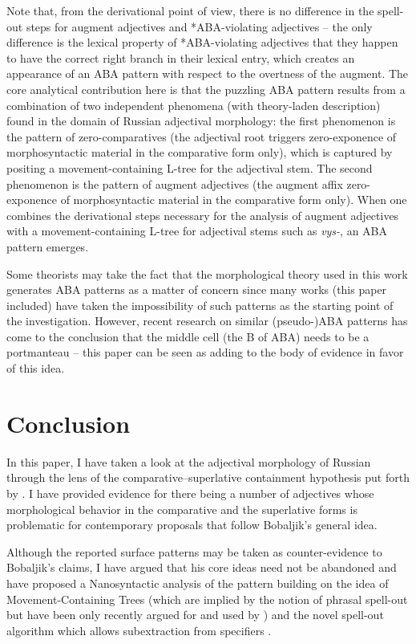 \documentclass[output=paper,colorlinks,citecolor=brown]{langscibook}
\begin{document}
Note that, from the derivational point of view, there is no difference in the spell-out steps for augment adjectives and {*}ABA-violating adjectives -- the only difference is the lexical property of {*}ABA-violating adjectives that they happen to have the correct right branch in their lexical entry, which creates an appearance of an ABA pattern with respect to the overtness of the augment. The core analytical contribution here is that the puzzling ABA pattern results from a combination of two independent phenomena (with theory-laden description) found in the domain of Russian adjectival morphology: the first phenomenon is the pattern of zero-comparatives (the adjectival root triggers zero-exponence of morphosyntactic material in the comparative form only), which is captured by positing a movement-containing L-tree for the adjectival stem. The second phenomenon is the pattern of augment adjectives (the augment affix zero-exponence of morphosyntactic material in the comparative form only). When one combines the derivational steps necessary for the analysis of augment adjectives with a mo\-ve\-ment-con\-taining L-tree for adjectival stems such as \textit{vys-}, an ABA pattern emerges.

Some theorists may take the fact that the morphological theory used in this work generates ABA patterns as a matter of concern since many works (this paper included) have taken the impossibility of such patterns as the starting point of the investigation. However, recent research on similar (pseudo-)ABA patterns \citep{Middleton:2021,Davis:2021} has come to the conclusion that the middle cell (the B of ABA) needs to be a portmanteau -- this paper can be seen as adding to the body of evidence in favor of this idea.

\section{Conclusion}\label{kas:sec:conclusion}

In this paper, I have taken a look at the adjectival morphology of Russian through the lens of the comparative--superlative containment hypothesis put forth by \citet{Bobaljik:2012}. I have provided evidence for there being a number of adjectives whose morphological behavior in the comparative and the superlative forms is problematic for contemporary proposals that follow Bobaljik's general idea.
	
Although the reported surface patterns may be taken as counter-evidence to Bobaljik's claims, I have argued that his core ideas need not be abandoned and have proposed a Nanosyntactic analysis of the pattern building on the idea of Movement-Containing Trees (which are implied by the notion of phrasal spell-out but have been only recently argued for and used by \citealt{Blix:2022}) and the novel spell-out algorithm which allows subextraction from specifiers \citep{Caha:2022b,Caha:2023}.
	
\end{document}
